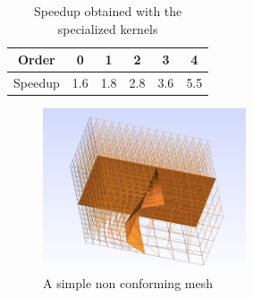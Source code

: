 \documentclass{svmult}
\begin{document}
\begin{table}[h]
  \centering
  \caption{Speedup obtained with the specialized kernels}
  \label{tab:speedup_specialisation}
  \begin{tabular}[h]{|c||c|c|c|c|c|}
    \hline
    Order   &   0 &   1 &   2 &   3 &   4 \\ \hline
    Speedup & 1.6 & 1.8 & 2.8 & 3.6 & 5.5 \\ \hline
  \end{tabular}
\end{table}

\begin{figure}
  \centering
  \includegraphics[width=6cm]{3zones-gmsh}
  \caption{A simple non conforming mesh\label{fig:simple-mesh}}
\end{figure}
\end{document}
